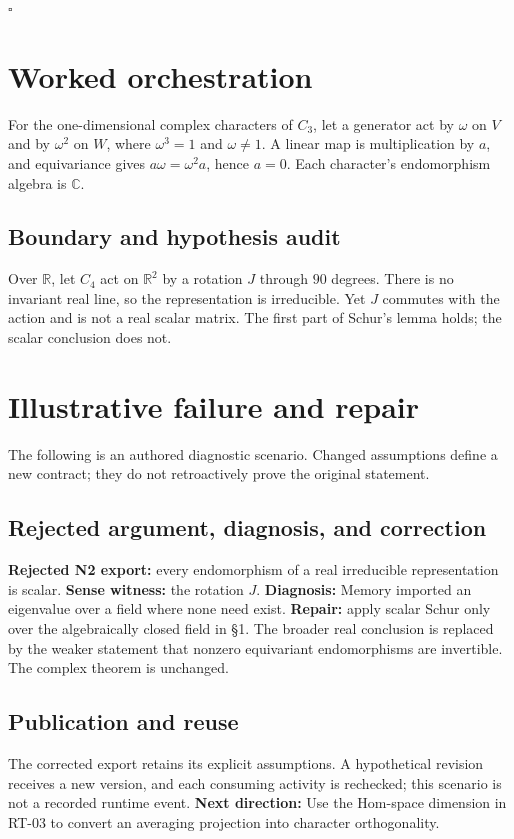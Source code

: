 \documentclass[preprint,12pt,aps,pra,showkeys,amsmath,amssymb,superscriptaddress,floatfix]{revtex4-2}
\theoremstyle{definition}
\theoremstyle{remark}
\begin{document}
\hfill$\square$

\section{Worked orchestration}

For the one-dimensional complex characters of \(C_3\), let a generator
act by \(\omega\) on \(V\) and by \(\omega^2\) on \(W\), where
\(\omega^3=1\) and \(\omega\ne1\). A linear map is multiplication by
\(a\), and equivariance gives \(a\omega=\omega^2a\), hence \(a=0\). Each
character's endomorphism algebra is \(\mathbb C\).

\subsection{Boundary and hypothesis audit}

Over \(\mathbb R\), let \(C_4\) act on \(\mathbb R^2\) by a rotation
\(J\) through \(90\) degrees. There is no invariant real line, so the
representation is irreducible. Yet \(J\) commutes with the action and is
not a real scalar matrix. The first part of Schur's lemma holds; the
scalar conclusion does not.

\section{Illustrative failure and repair}

The following is an authored diagnostic scenario. Changed assumptions
define a new contract; they do not retroactively prove the original
statement.

\subsection{Rejected argument, diagnosis, and correction}
\textbf{Rejected N2 export:} every endomorphism of a real irreducible
representation is scalar. \textbf{Sense witness:} the rotation \(J\).
\textbf{Diagnosis:} Memory imported an eigenvalue over a field where
none need exist. \textbf{Repair:} apply scalar Schur only over the
algebraically closed field in §1. The broader real conclusion is
replaced by the weaker statement that nonzero equivariant endomorphisms
are invertible. The complex theorem is unchanged.

\subsection{Publication and reuse}
The corrected export retains its explicit assumptions. A hypothetical
revision receives a new version, and each consuming activity is
rechecked; this scenario is not a recorded runtime event. \textbf{Next
direction:} Use the Hom-space dimension in RT-03 to convert an averaging
projection into character orthogonality.
\end{document}
